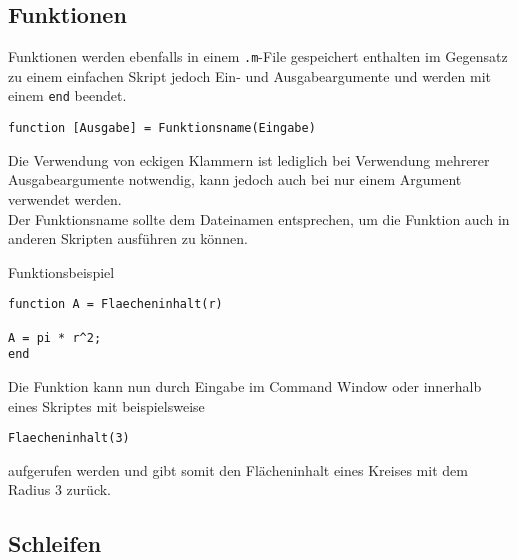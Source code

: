         \subsection{Funktionen}
        Funktionen werden ebenfalls in einem \texttt{.m}-File gespeichert enthalten im Gegensatz zu einem einfachen Skript jedoch Ein- und Ausgabeargumente und werden mit einem \texttt{end} beendet.
        \begin{center}
                \texttt{function [Ausgabe] = Funktionsname(Eingabe)}     
        \end{center}
                Die Verwendung von eckigen Klammern ist lediglich bei Verwendung mehrerer Ausgabeargumente notwendig, kann jedoch auch bei nur einem Argument verwendet werden. \\
                Der Funktionsname sollte dem Dateinamen entsprechen, um die Funktion auch in anderen Skripten ausführen zu können.
                \begin{Codelösung}{Funktionsbeispiel}
                        \begin{lstlisting}
function A = Flaecheninhalt(r)

A = pi * r^2;
end       
                        \end{lstlisting}

                \end{Codelösung}
                \noindent
                Die Funktion kann nun durch Eingabe im Command Window oder innerhalb eines Skriptes mit beispielsweise
                \begin{center}
                        \texttt{Flaecheninhalt(3)}
                \end{center}
                aufgerufen werden und gibt somit den Flächeninhalt eines Kreises mit dem Radius 3 zurück.
        \subsection{Schleifen}